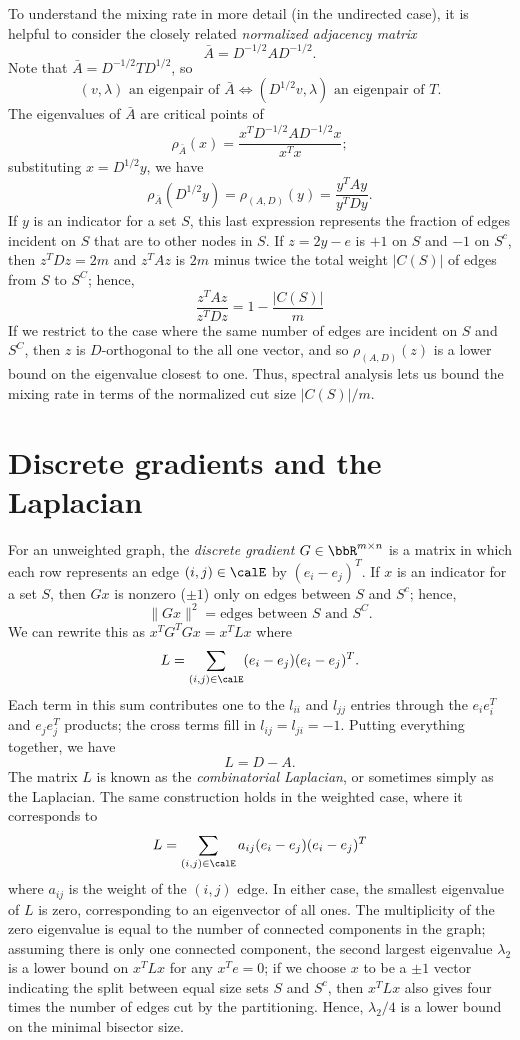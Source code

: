 \documentclass[12pt, leqno]{article} %
\begin{document}
To understand the mixing rate in more detail (in the undirected case),
it is helpful to consider the closely related
{\em normalized  adjacency matrix}
\[
  \bar{A} = D^{-1/2} A D^{-1/2}.
\]
Note that $\bar{A} = D^{-1/2} T D^{1/2}$, so
\[
  (v, \lambda) \mbox{ an eigenpair of } \bar{A} \iff
  (D^{1/2} v, \lambda) \mbox{ an eigenpair of } T.
\]
The eigenvalues of $\bar{A}$ are critical points of
\[
  \rho_{\bar{A}}(x) = \frac{x^T D^{-1/2} A D^{-1/2} x}{x^T x};
\]
substituting $x = D^{1/2} y$, we have
\[
  \rho_{\bar{A}}(D^{1/2} y) = \rho_{(A,D)}(y) = \frac{y^T A y}{y^T D y}.
\]
If $y$ is an indicator for a set $S$, this last expression represents
the fraction of edges incident on $S$ that are to other nodes in $S$.
If $z = 2y-e$ is $+1$ on $S$ and $-1$ on $S^c$, then $z^T D z = 2m$
and $z^T A z$ is $2m$ minus twice the total weight $|C(S)|$ of
edges from $S$ to $S^C$; hence,
\[
  \frac{z^T A z}{z^T D z} = 1-\frac{|C(S)|}{m}
\]
If we restrict to the case where the same number of edges
are incident on $S$ and $S^C$, then $z$ is $D$-orthogonal
to the all one vector, and so $\rho_{(A,D)}(z)$ is a lower
bound on the eigenvalue closest to one.  Thus, spectral analysis
lets us bound the mixing rate in terms of the normalized cut
size $|C(S)|/m$.

\section{Discrete gradients and the Laplacian}

For an unweighted graph, the {\em discrete gradient}
$G \in \bbR^{m  \times n}$ is a matrix in which each row represents an edge
$(i,j) \in \calE$ by $(e_i-e_j)^T$.  If $x$ is an indicator for a set $S$,
then $Gx$ is nonzero ($\pm 1$) only on edges between $S$ and $S^c$;
hence,
\[
  \|Gx\|^2 = \mbox{edges between } S \mbox{ and } S^C.
\]
We can rewrite this as $x^T G^T G x = x^T L x$ where
\[
  L = \sum_{(i,j) \in \calE} (e_i-e_j) (e_i-e_j)^T.
\]
Each term in this sum contributes one to the $l_{ii}$ and $l_{jj}$
entries through the $e_i e_i^T$ and $e_j e_j^T$ products; the cross
terms fill in $l_{ij} = l_{ji} = -1$.  Putting everything together,
we have
\[
  L = D-A.
\]
The matrix $L$ is known as the {\em combinatorial Laplacian},
or sometimes simply as the Laplacian.  The same construction holds
in the weighted case, where it corresponds to
\[
  L = \sum_{(i,j) \in \calE} a_{ij} (e_i-e_j) (e_i-e_j)^T
\]
where $a_{ij}$ is the weight of the $(i,j)$ edge.  In either case,
the smallest eigenvalue of $L$ is zero, corresponding to an
eigenvector of all ones.  The multiplicity of the zero eigenvalue
is equal to the number of connected components in the graph;
assuming there is only one connected component, the second largest
eigenvalue $\lambda_2$ is a lower bound on $x^T L x$ for any $x^T e = 0$;
if we choose $x$ to be a $\pm 1$ vector indicating the split between
equal size sets $S$ and $S^c$, then $x^T L x$ also gives four times
the number of edges cut by the partitioning.  Hence, $\lambda_2/4$
is a lower bound on the minimal bisector size.
\end{document}
